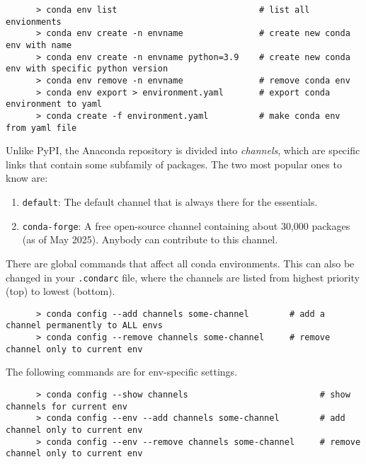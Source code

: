   \begin{example}
    \begin{lstlisting}
      > conda env list                            # list all envionments
      > conda env create -n envname               # create new conda env with name 
      > conda env create -n envname python=3.9    # create new conda env with specific python version
      > conda env remove -n envname               # remove conda env
      > conda env export > environment.yaml       # export conda environment to yaml 
      > conda create -f environment.yaml          # make conda env from yaml file 
    \end{lstlisting}
  \end{example}

  Unlike PyPI, the Anaconda repository is divided into \textit{channels}, which are specific links that contain some subfamily of packages. The two most popular ones to know are: 
  \begin{enumerate}
    \item \texttt{default}: The default channel that is always there for the essentials. 
    \item \texttt{conda-forge}: A free open-source channel containing about 30,000 packages (as of May 2025). Anybody can contribute to this channel. 
  \end{enumerate} 

  \begin{example}
    There are global commands that affect all conda environments. This can also be changed in your \texttt{.condarc} file, where the channels are listed from highest priority (top) to lowest (bottom). 
    \begin{lstlisting}
      > conda config --add channels some-channel        # add a channel permanently to ALL envs 
      > conda config --remove channels some-channel     # remove channel only to current env 
    \end{lstlisting}

    The following commands are for env-specific settings. 
    \begin{lstlisting}
      > conda config --show channels                          # show channels for current env
      > conda config --env --add channels some-channel        # add channel only to current env 
      > conda config --env --remove channels some-channel     # remove channel only to current env 
    \end{lstlisting}
  \end{example} 
  
